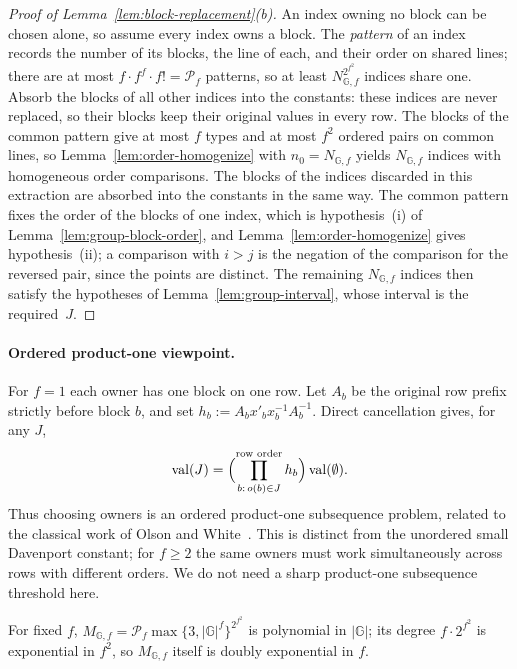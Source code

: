 \documentclass[11pt]{article}
\numberwithin{equation}{section}
\theoremstyle{plain}
\theoremstyle{definition}
\theoremstyle{remark}
\theoremstyle{plain}
\begin{document}
\begin{proof}[Proof of Lemma~\ref{lem:block-replacement}\textup{(b)}]
An index owning no block can be chosen alone, so assume every index owns a block.
The \emph{pattern} of an index records the number of its blocks, the line of each,
and their order on shared lines; there are at most $f\cdot f^f\cdot f!=\mathcal P_f$
patterns, so at least $N_{{\mathbb G},f}^{2^{f^2}}$ indices share one.  Absorb the blocks of
all other indices into the constants: these indices are never replaced, so their
blocks keep their original values in every row.  The blocks of the common pattern
give at most $f$ types and at most $f^2$ ordered pairs on common lines, so
Lemma~\ref{lem:order-homogenize} with $n_0=N_{{\mathbb G},f}$ yields $N_{{\mathbb G},f}$
indices with homogeneous order comparisons.  The blocks of the indices discarded
in this extraction are absorbed into the constants in the same way.  The common
pattern fixes the order of the blocks of one index, which is hypothesis~(i) of
Lemma~\ref{lem:group-block-order}, and Lemma~\ref{lem:order-homogenize} gives
hypothesis~(ii); a comparison with $i>j$ is the negation of the comparison for the
reversed pair, since the points are distinct.  The remaining
$N_{{\mathbb G},f}$ indices then satisfy the hypotheses of
Lemma~\ref{lem:group-interval}, whose interval is the required~$J$.
\end{proof}

\paragraph{Ordered product-one viewpoint.}
For $f=1$ each owner has one block on one row.  Let $A_b$ be the original
row prefix strictly before block $b$, and set
$h_b:=A_bx'_bx_b^{-1}A_b^{-1}$.  Direct cancellation gives, for any $J$,
\[
 \operatorname{val}(J)=
 \Bigl(\prod_{b:\,o(b)\in J}^{\text{row order}}h_b\Bigr)
 \operatorname{val}(\emptyset).
\]
Thus choosing owners is an ordered product-one subsequence problem,
related to the classical work of Olson and White~\cite{OlsonWhite1977}.
This is distinct from the unordered small Davenport constant; for $f\ge2$
the same owners must work simultaneously across rows with different orders.
We do not need a sharp product-one subsequence threshold here.

For fixed $f$, $M_{{\mathbb G},f}=\mathcal P_f\max\{3,|{\mathbb G}|^f\}^{2^{f^2}}$ is polynomial in $|{\mathbb G}|$; its
degree $f\cdot2^{f^2}$ is exponential in $f^2$, so $M_{{\mathbb G},f}$ itself is doubly
exponential in $f$.
\end{document}
